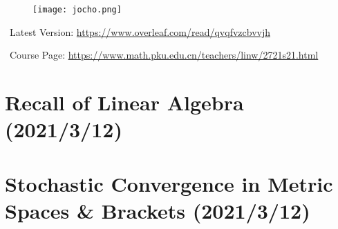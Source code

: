 \documentclass[11pt, a3paper, openany]{article}
\theoremstyle{remark}
\theoremstyle{remark}
\theoremstyle{remark}
\newenvironment{Proof of claim}
  {\begin{proof}[\normalfont \textbf{Proof of claim}]}
  {\end{proof}}
\theoremstyle{definition}
\theoremstyle{remark}
\theoremstyle{plain}
\begin{document}
\begin{figure}[!b]
	\centering
	\texttt{[image: jocho.png]}
	\vspace{11ex}
\end{figure}


\Pickup\ Latest Version: \url{https://www.overleaf.com/read/qvqfvzcbvvjh}

\Pickup\ Course Page: \url{https://www.math.pku.edu.cn/teachers/linw/2721s21.html}
\clearpage

\section{Recall of Linear Algebra \sf\scriptsize (2021/3/12)}
\section{Stochastic Convergence in Metric Spaces \& Brackets \sf\scriptsize (2021/3/12)}
\end{document}
